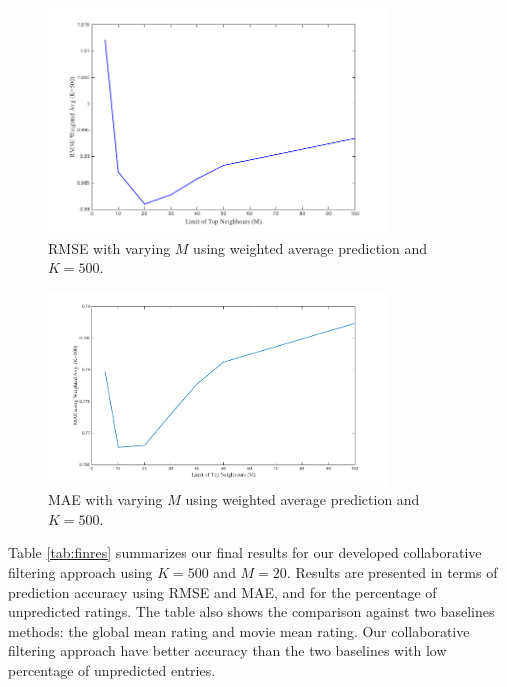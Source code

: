 
\begin{figure}[!ht]
  \centering \includegraphics[width=0.8\textwidth]{images/rmsem.png}
  \caption{RMSE with varying $M$ using weighted average prediction and $K=500$.}
  \label{fig:rmsem}
\end{figure}

\begin{figure}[!ht]
  \centering \includegraphics[width=0.8\textwidth]{images/MAEm.png}
  \caption{MAE with varying $M$ using weighted average prediction and $K=500$.}
  \label{fig:maem}
\end{figure}

Table \ref{tab:finres} summarizes our final results for our developed
collaborative filtering approach using $K=500$ and $M=20$. Results are
presented in terms of prediction accuracy using RMSE and MAE, and for
the percentage of unpredicted ratings. The table also shows the
comparison against two baselines methods: the global mean rating and
movie mean rating. Our collaborative filtering approach have better
accuracy than the two baselines with low percentage of unpredicted
entries.

